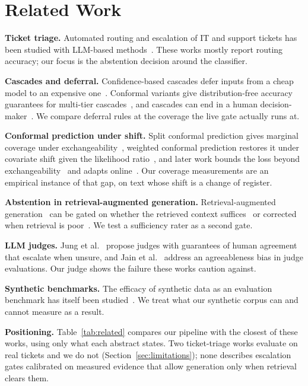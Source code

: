 \documentclass[conference,a4paper]{IEEEtran}
\begin{document}
\section{Related Work}
\label{sec:related}
\textbf{Ticket triage.} Automated routing and escalation of IT and support tickets has been studied with LLM-based methods~\cite{tickit,paket_ticket,redcap_llm_triage}.
These works mostly report routing accuracy; our focus is the abstention decision around the classifier.

\textbf{Cascades and deferral.} Confidence-based cascades defer inputs from a cheap model to an expensive one~\cite{jitkrittum_cascade}. Conformal variants give distribution-free accuracy guarantees for multi-tier cascades~\cite{conformal_cascade}, and cascades can end in a human decision-maker~\cite{fanconi_defer}.
We compare deferral rules at the coverage the live gate actually runs at.

\textbf{Conformal prediction under shift.} Split conformal prediction gives marginal coverage under exchangeability~\cite{vovk_alrw,angelopoulos_gentle}, weighted conformal prediction restores it under covariate shift given the likelihood ratio~\cite{tibshirani_covshift}, and later work bounds the loss beyond exchangeability~\cite{barber_beyond} and adapts online~\cite{gibbs_adaptive}. Our coverage measurements are an empirical instance of that gap, on text whose shift is a change of register.

\textbf{Abstention in retrieval-augmented generation.} Retrieval-augmented generation~\cite{lewis_rag} can be gated on whether the retrieved context suffices~\cite{joren_sufficient} or corrected when retrieval is poor~\cite{crag}.
We test a sufficiency rater as a second gate.

\textbf{LLM judges.} Jung et al.~\cite{jung_trust_escalate} propose judges with guarantees of human agreement that escalate when unsure, and Jain et al.~\cite{jain_judges} address an agreeableness bias in judge evaluations.
Our judge shows the failure these works caution against.

\textbf{Synthetic benchmarks.} The efficacy of synthetic data as an evaluation benchmark has itself been studied~\cite{maheshwari_synthetic}.
We treat what our synthetic corpus can and cannot measure as a result.

\textbf{Positioning.} Table~\ref{tab:related} compares our pipeline with the closest of these works, using only what each abstract states. Two ticket-triage works evaluate on real tickets and we do not (Section~\ref{sec:limitations}); none describes escalation gates calibrated on measured evidence that allow generation only when retrieval clears them.
\end{document}
